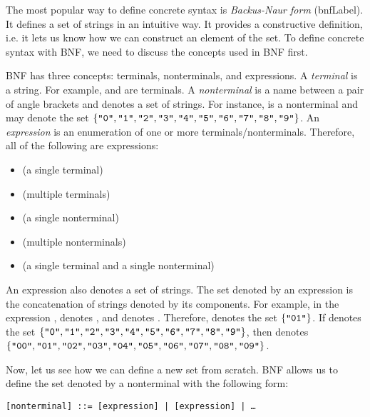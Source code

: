 The most popular way to define concrete syntax is \textit{Backus-Naur
form} (\acrshort{bnfLabel}). It defines a set of strings
in an intuitive way. It provides a constructive definition, i.e. it lets us know
how we can construct an element of the set. To define concrete syntax with BNF,
we need to discuss the concepts used in BNF first.

BNF has three concepts: terminals, nonterminals, and expressions. A
\textit{terminal} is a string. For example,  and
 are terminals. A \textit{nonterminal} is a name
between a pair of angle brackets and denotes a set of strings. For instance,
 is a nonterminal and may denote the set
$\{\texttt{"0"},\texttt{"1"},\texttt{"2"},\texttt{"3"},\texttt{"4"},\texttt{"5"},\texttt{"6"},\texttt{"7"},\texttt{"8"},\texttt{"9"}\}$.
An \textit{expression} is an enumeration of one or more
terminals/nonterminals. Therefore, all of the following are expressions:

\begin{itemize}
  \item {} (a single terminal)
  \item {}  (multiple terminals)
  \item {} (a single nonterminal)
  \item {}  (multiple nonterminals)
  \item {}  (a single terminal and a single nonterminal)
\end{itemize}

An expression also denotes a set of strings. The set denoted by an expression is
the concatenation of strings denoted by its components. For example, in the
expression  ,  denotes , and 
denotes . Therefore,   denotes the set $\{
  \texttt{"01"} \}$. If  denotes the set
$\{\texttt{"0"},\texttt{"1"},\texttt{"2"},\texttt{"3"},\texttt{"4"},\texttt{"5"},\texttt{"6"},\texttt{"7"},\texttt{"8"},\texttt{"9"}\}$,
then   denotes
$\{\texttt{"00"},\texttt{"01"},\texttt{"02"},\texttt{"03"},\texttt{"04"},\texttt{"05"},\texttt{"06"},\texttt{"07"},\texttt{"08"},\texttt{"09"}\}$.

Now, let us see how we can define a new set from scratch. BNF allows us to define
the set denoted by a nonterminal with the following form:

\begin{verbatim}
[nonterminal] ::= [expression] | [expression] | …
\end{verbatim}

